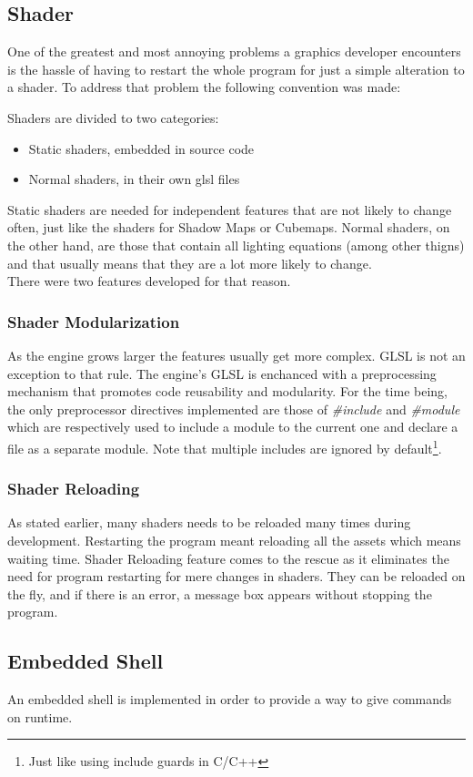 \subsection{Shader}
One of the greatest and most annoying problems a graphics developer encounters is the hassle of
having to restart the whole program for just a simple alteration to a shader. To address that
problem the following convention was made:

\noindent Shaders are divided to two categories:

\begin{itemize}
\item Static shaders, embedded in source code
\item Normal shaders, in their own glsl files
\end{itemize}

\noindent Static shaders are needed for independent features that are not likely to change often,
just like the shaders for Shadow Maps or Cubemaps. Normal shaders, on the other hand, are those
that contain all lighting equations (among other thigns) and that usually means that they are a
lot more likely to change.\\
There were two features developed for that reason.

\subsubsection{Shader Modularization}
As the engine grows larger the features usually get more complex. GLSL is not an exception to that
rule. The engine's GLSL is enchanced with a preprocessing mechanism that promotes code reusability
and modularity. For the time being, the only preprocessor directives implemented are those of
\textit{\#include} and \textit{\#module} which are respectively used to include a module to the
current one and declare a file as a separate module. Note that multiple includes are ignored by
default\footnote{Just like using include guards in C/C++}.

\subsubsection{Shader Reloading}
As stated earlier, many shaders needs to be reloaded many times during development. Restarting
the program meant reloading all the assets which means waiting time. Shader Reloading feature
comes to the rescue as it eliminates the need for program restarting for mere changes in shaders.
They can be reloaded on the fly, and if there is an error, a message box appears without stopping
the program.

\subsection{Embedded Shell}
An embedded shell is implemented in order to provide a way to give commands on runtime.
